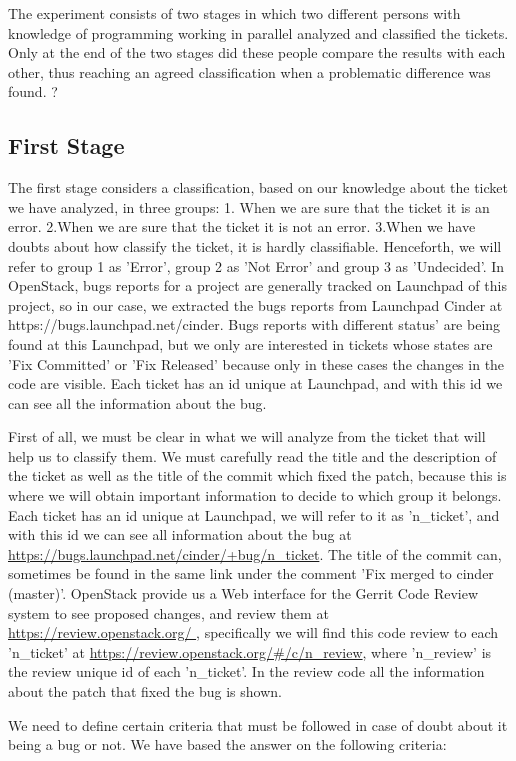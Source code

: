 \documentclass[a4paper]{article}
\begin{document}
The experiment consists of two stages in which two different persons with knowledge of programming working in parallel analyzed and classified the tickets. Only at the end of the two stages did these people compare the results with each other, thus reaching an agreed classification when a problematic difference was found. ?
\subsection{First Stage}
The first stage considers a classification, based on our knowledge about the ticket we have analyzed, in three groups: 1. When we are sure that the ticket it is an error. 2.When we are sure that the ticket it is not an error. 3.When we have doubts about how classify the ticket, it is hardly classifiable. Henceforth, we will refer to group 1 as 'Error', group 2 as 'Not Error' and group 3 as 'Undecided'. In OpenStack, bugs reports for a project are generally tracked on Launchpad of this project, so in our case, we extracted the bugs reports from Launchpad Cinder at https://bugs.launchpad.net/cinder. Bugs reports with different status' are being found at this Launchpad, but we only are interested in tickets whose states are 'Fix Committed' or 'Fix Released' because only in these cases the changes in the code are visible. Each ticket has an id unique at Launchpad, and with this id we can see all the information about the bug. 


First of all, we must be clear in what we will analyze from the ticket that will help us to classify them. We must carefully read the title and the description of the ticket as well as the title of the commit which fixed the patch, because this is where we will obtain important information to decide to which group it belongs. Each ticket has an id unique at Launchpad, we will refer to it as 'n\_ticket', and with this id we can see all information about the bug at  \url{https://bugs.launchpad.net/cinder/+bug/n_ticket}. The title of the commit can, sometimes be found in the same link under the comment 'Fix merged to cinder (master)'. OpenStack provide us a Web interface for the Gerrit Code Review system to see proposed changes, and review them at \url{https://review.openstack.org/ }, specifically we will find this code review to each 'n\_ticket' at \url{https://review.openstack.org/#/c/n_review}, where 'n\_review' is the review unique id of each 'n\_ticket'. In the review code all the information about the patch that fixed the bug is shown.

We need to define certain criteria that must be followed in case of doubt about it being a bug or not. We have based the answer on the following criteria: 
\end{document}
